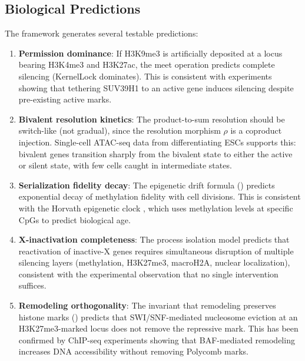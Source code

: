 \documentclass[12pt,a4paper]{article}
\begin{document}
\subsection{Biological Predictions}

The framework generates several testable predictions:

\begin{enumerate}
    \item \textbf{Permission dominance}: If H3K9me3 is artificially deposited at a locus bearing H3K4me3 and H3K27ac, the meet operation predicts complete silencing (KernelLock dominates). This is consistent with experiments showing that tethering SUV39H1 to an active gene induces silencing despite pre-existing active marks.

    \item \textbf{Bivalent resolution kinetics}: The product-to-sum resolution should be switch-like (not gradual), since the resolution morphism $\rho$ is a coproduct injection. Single-cell ATAC-seq data from differentiating ESCs supports this: bivalent genes transition sharply from the bivalent state to either the active or silent state, with few cells caught in intermediate states.

    \item \textbf{Serialization fidelity decay}: The epigenetic drift formula () predicts exponential decay of methylation fidelity with cell divisions. This is consistent with the Horvath epigenetic clock \cite{horvath2013}, which uses methylation levels at specific CpGs to predict biological age.

    \item \textbf{X-inactivation completeness}: The process isolation model predicts that reactivation of inactive-X genes requires simultaneous disruption of multiple silencing layers (methylation, H3K27me3, macroH2A, nuclear localization), consistent with the experimental observation that no single intervention suffices.

    \item \textbf{Remodeling orthogonality}: The invariant that remodeling preserves histone marks () predicts that SWI/SNF-mediated nucleosome eviction at an H3K27me3-marked locus does not remove the repressive mark. This has been confirmed by ChIP-seq experiments showing that BAF-mediated remodeling increases DNA accessibility without removing Polycomb marks.
\end{enumerate}
\end{document}
